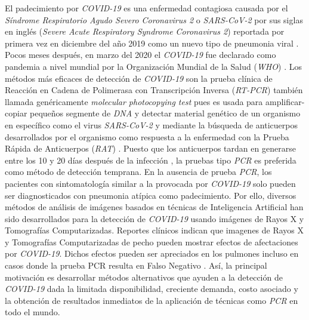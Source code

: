 El padecimiento por \textit{COVID-19} es una enfermedad contagiosa causada por el \textit{Síndrome
Respiratorio Agudo Severo Coronavirus 2} o \textit{SARS-CoV-2} por sus siglas en inglés
(\textit{Severe Acute Respiratory Syndrome Coronavirus 2}) reportada por primera vez en diciembre
del año 2019 como un nuevo tipo de pneumonia viral \cite{huang2020clinical}. Pocos meses después,
en marzo del 2020 el \textit{COVID-19} fue declarado como pandemia a nivel mundial por la
Organización Mundial de la Salud (\textit{WHO}) \cite{world2020director}. Los métodos más eficaces
de detección de \textit{COVID-19} son la prueba clínica de Reacción en Cadena de Polimerasa con
Transcripción Inversa
(\textit{RT-PCR}) también llamada genéricamente \textit{molecular photocopying test} pues es usada
para amplificar-copiar pequeños
segmente de \textit{DNA} y detectar material genético de un organismo en específico como el virus
\textit{SARS-CoV-2} y mediante la búsqueda de anticuerpos desarrollados por el organismo como
respuesta a la enfermedad con la Prueba Rápida de Anticuerpos (\textit{RAT})
\cite{Gupta2021, Apra2021, pub.1136450856, LIU2021112817}. Puesto que los
anticuerpos tardan en generarse entre los 10 y 20 días después de la infección
\cite{lou2020serology,o2021age,VABRET2020910}, la pruebas tipo \textit{PCR} es preferida como
método de detección temprana. En la ausencia de prueba \textit{PCR}, los pacientes con sintomatología
similar a la provocada por \textit{COVID-19} solo pueden ser diagnosticados con pneumonia atípica
como padecimiento. Por ello, diversos métodos de análisis de imágenes basados en técnicas
de Inteligencia Artificial han sido desarrollados para la detección de \textit{COVID-19} usando
imágenes de Rayos X y Tomografías Computarizadas. Reportes clínicos indican que imagenes de Rayos X
y Tomografías Computarizadas de pecho pueden mostrar efectos de afectaciones por \textit{COVID-19}.
Dichos efectos pueden ser apreciados en los pulmones incluso en casos donde la prueba PCR resulta
en Falso Negativo \cite{ai2020correlation, wong2020frequency}. Así, la principal motivación es
desarrollar métodos alternativos que ayuden a la detección de \textit{COVID-19} dada la limitada
disponibilidad, creciente demanda, costo asociado y la obtención de resultados inmediatos de la
aplicación de técnicas como \textit{PCR} en todo el mundo.

